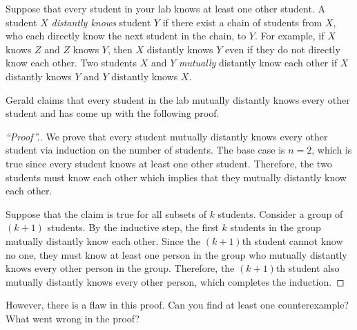 \documentclass{article}
\begin{document}
\begin{question}
Suppose that every student in your lab knows at least one other student. A student $X$ {\em distantly knows} student $Y$ if there exist a chain of students from $X$, who each directly know the next student in the chain, to $Y$. For example, if $X$ knows $Z$ and $Z$ knows $Y$, then $X$ distantly knows $Y$ even if they do not directly know each other. Two students $X$ and $Y$ {\em mutually} distantly know each other if $X$ distantly knows $Y$ and $Y$ distantly knows $X$.

Gerald claims that every student in the lab mutually distantly knows every other student and has come up with the following proof.
\begin{proof}[``Proof''.]
We prove that every student mutually distantly knows every other student via induction on the number of students. The base case is $n = 2$, which is true since every student knows at least one other student. Therefore, the two students must know each other which implies that they mutually distantly know each other.

Suppose that the claim is true for all subsets of $k$ students. Consider a group of $(k + 1)$ students. By the inductive step, the first $k$ students in the group mutually distantly know each other. Since the $(k + 1)$th student cannot know no one, they must know at least one person in the group who mutually distantly knows every other person in the group. Therefore, the $(k + 1)$th student also mutually distantly knows every other person, which completes the induction.
\end{proof}

However, there is a flaw in this proof. Can you find at least one counterexample? What went wrong in the proof?
\end{question}
\end{document}
